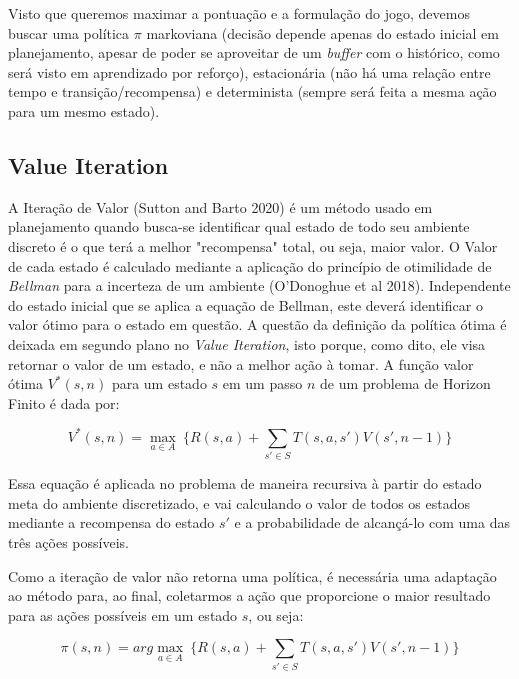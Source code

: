 \documentclass[letterpaper]{article} %
\begin{document}
Visto que queremos maximar a pontuação e a formulação do jogo, devemos buscar uma política $\pi$ markoviana (decisão depende apenas do estado inicial em planejamento, apesar de poder se aproveitar de um \textit{buffer} com o histórico, como será visto em aprendizado por reforço), estacionária (não há uma relação entre tempo e transição/recompensa) e determinista (sempre será feita a mesma ação para um mesmo estado).

\subsection{Value Iteration}
A Iteração de Valor (Sutton and Barto 2020) é um método usado em planejamento quando busca-se identificar qual estado de todo seu ambiente discreto é o que terá a melhor "recompensa" total, ou seja, maior valor. O Valor de cada estado é calculado mediante a aplicação do princípio de otimilidade de \textit{Bellman} para a incerteza de um ambiente (O'Donoghue et al 2018). Independente do estado inicial que se aplica a equação de Bellman, este deverá identificar o valor ótimo para o estado em questão. A questão da definição da política ótima é deixada em segundo plano no \textit{Value Iteration}, isto porque, como dito, ele visa retornar o valor de um estado, e não a melhor ação à tomar. A função valor ótima $V^{*}(s, n)$ para um estado $s$ em um passo $n$ de um problema de Horizon Finito é dada por:

$$
V^{*}(s, n) = \max_{a \in A} \ \{ R(s,a) + \sum_{s' \in S} T(s,a,s')  V(s', n-1)\}
$$

Essa equação é aplicada no problema de maneira recursiva à partir do estado meta do ambiente discretizado, e vai calculando o valor de todos os estados mediante a recompensa do estado $s'$ e a probabilidade de alcançá-lo com uma das três ações possíveis.

Como a iteração de valor não retorna uma política, é necessária uma adaptação ao método para, ao final, coletarmos a ação que proporcione o maior resultado para as ações possíveis em um estado $s$, ou seja:

$$
\pi(s, n) = arg \max_{a \in A} \ \{ R(s,a) + \sum_{s' \in S} T(s,a,s')  V(s', n-1)\}
$$
\end{document}
